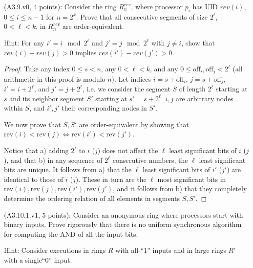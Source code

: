 \newcommand{\off}[1]{\text{off}_{#1}}
\newcommand{\rev}[1]{\text{rev}(#1)}

\begin{Exc}{(A3.9.v0, 4 points):}
Consider the ring $R_n^{rev}$, where processor $p_i$ has UID
$rev(i)$, $0\leq i \leq n-1$ for $n=2^k$. Prove that all
consecutive segments of size $2^\ell$, $0<\ell < k$, in $R_n^{rev}$
are order-equivalent.

\normalfont
Hint: For any $i'=i \mod 2^\ell$ and $j'=j \mod 2^\ell$ with $j\neq i$,
show that $rev(i) - rev(j)>0$ implies $rev(i') - rev(j')>0$.
\end{Exc}

\begin{proof}
Take any index $0 \leq s < n$, any $0 < \ell < k$, and any $0 \leq \off{i}, \off{j} < 2^\ell$ (all
arithmetic in this proof is modulo $n$).
Let indices $i = s + \off{i}$, $j = s + \off{j}$, $i' = i + 2^\ell$, and $j' = j + 2^\ell$, i.e.
we consider the segment $S$ of length $2^\ell$ starting at $s$ and its neighbor segment $S'$ starting
at $s' = s + 2^\ell$. $i, j$ are arbitrary nodes within $S$, and $i', j'$ their corresponding nodes
in $S'$.

We now prove that $S, S'$ are order-equivalent by showing that
$\rev{i} < \rev{j} \iff \rev{i'} < \rev{j'}$.

Notice that a) adding $2^\ell$ to $i$ ($j$) does not affect the $\ell$ least significant bits of $i$ ($j$),
and that b) in any sequence of $2^\ell$ consecutive numbers, the $\ell$ least significant bits are unique.
It follows from a) that the $\ell$ least significant bits of $i'$ ($j'$) are identical to those of
$i$ ($j$). These in turn are the $\ell$ most significant bits in $\rev{i}, \rev{j}, \rev{i'}, \rev{j'}$,
and it follows from b) that they completely determine the ordering relation of all elements in segments
$S, S'$.
\end{proof}


\begin{Exc}{(A3.10.1.v1, 5 points):}
Consider an anonymous ring where processors start with binary
inputs. Prove rigorously that there is no uniform synchronous
algorithm for computing the AND of all the input bits.

\normalfont
Hint: Consider executions in rings $R$ with all-``1'' inputs and
in large rings $R'$ with a single``0'' input.
\end{Exc}

